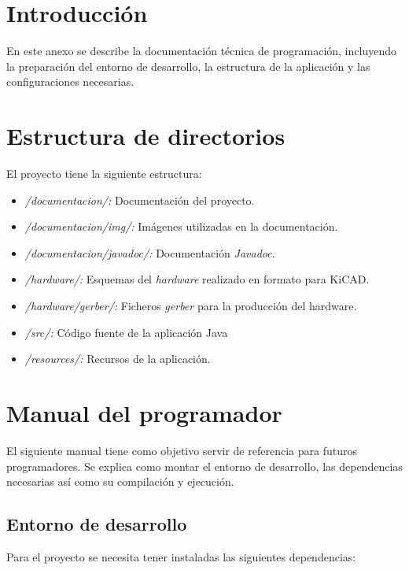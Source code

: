 
\section{Introducción}

En este anexo se describe la documentación técnica de programación, incluyendo la preparación del entorno de desarrollo, la estructura de la aplicación y las configuraciones necesarias.

\section{Estructura de directorios}

El proyecto tiene la siguiente estructura:

\begin{itemize}
\item
\textit{/documentacion/:} Documentación del proyecto.
\item
\textit{/documentacion/img/:} Imágenes utilizadas en la documentación.
\item
\textit{/documentacion/javadoc/:} Documentación \emph{Javadoc}.
\item
\textit{/hardware/:} Esquemas del \emph{hardware} realizado en formato para KiCAD.
\item
\textit{/hardware/gerber/:} Ficheros \emph{gerber} para la producción del hardware.
\item
\textit{/src/:} Código fuente de la aplicación Java
\item
\textit{/resources/:} Recursos de la aplicación.

\end{itemize}


\section{Manual del programador}

El siguiente manual tiene como objetivo servir de referencia para futuros programadores. Se explica como montar el entorno de desarrollo, las dependencias necesarias así como su compilación y ejecución.

\subsection{Entorno de desarrollo}

Para el proyecto se necesita tener instaladas las siguientes dependencias:

